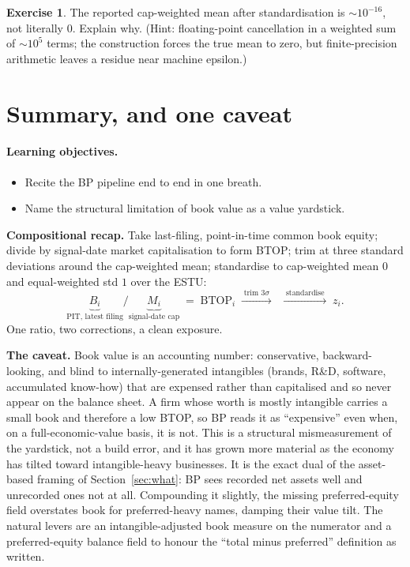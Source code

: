 \documentclass[11pt]{article}
\theoremstyle{definition}
\newtheorem{exercise}{Exercise}[section]
\theoremstyle{plain}
\theoremstyle{remark}
\begin{document}
\begin{exercise}
The reported cap-weighted mean after standardisation is $\sim 10^{-16}$, not literally $0$. Explain why. (Hint: floating-point cancellation in a weighted sum of $\sim 10^{5}$ terms; the construction forces the true mean to zero, but finite-precision arithmetic leaves a residue near machine epsilon.)
\end{exercise}

\section{Summary, and one caveat}\label{sec:summary}

\paragraph{Learning objectives.}
\begin{itemize}[leftmargin=1.4em,nosep]
  \item Recite the BP pipeline end to end in one breath.
  \item Name the structural limitation of book value as a value yardstick.
\end{itemize}

\textbf{Compositional recap.} Take last-filing, point-in-time common book equity; divide by signal-date market capitalisation to form BTOP; trim at three standard deviations around the cap-weighted mean; standardise to cap-weighted mean $0$ and equal-weighted std $1$ over the ESTU:
\[
  \underbrace{B_i}_{\text{PIT, latest filing}} \Big/ \underbrace{M_i}_{\text{signal-date cap}}
  \;=\; \mathrm{BTOP}_i
  \;\xrightarrow{\;\text{trim }3\sigma\;}\;
  \;\xrightarrow{\;\text{standardise}\;}\; z_i.
\]
One ratio, two corrections, a clean exposure.

\begin{pitfall}
\textbf{The caveat.} Book value is an accounting number: conservative, backward-looking, and blind to internally-generated intangibles (brands, R\&D, software, accumulated know-how) that are expensed rather than capitalised and so never appear on the balance sheet. A firm whose worth is mostly intangible carries a small book and therefore a low BTOP, so BP reads it as ``expensive'' even when, on a full-economic-value basis, it is not. This is a structural mismeasurement of the yardstick, not a build error, and it has grown more material as the economy has tilted toward intangible-heavy businesses. It is the exact dual of the asset-based framing of Section~\ref{sec:what}: BP sees recorded net assets well and unrecorded ones not at all. Compounding it slightly, the missing preferred-equity field overstates book for preferred-heavy names, damping their value tilt. The natural levers are an intangible-adjusted book measure on the numerator and a preferred-equity balance field to honour the ``total minus preferred'' definition as written.
\end{pitfall}
\end{document}
